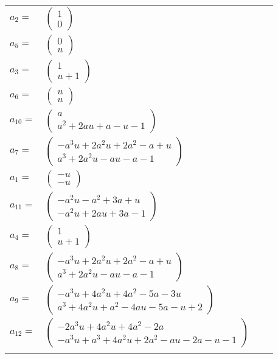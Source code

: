 \documentclass[1p]{elsarticle_modified}
\theoremstyle{definition}
\begin{document}
\begin{tabular}{m{7pt} m{180pt} m{7pt} m{180pt} }
\flushright $a_{2}=$&$\begin{pmatrix}1\\0\end{pmatrix}$ \\
\flushright $a_{5}=$&$\begin{pmatrix}0\\u\end{pmatrix}$ \\
\flushright $a_{3}=$&$\begin{pmatrix}1\\u+1\end{pmatrix}$ \\
\flushright $a_{6}=$&$\begin{pmatrix}u\\u\end{pmatrix}$ \\
\flushright $a_{10}=$&$\begin{pmatrix}a\\a^2+2 a u+a- u-1\end{pmatrix}$ \\
\flushright $a_{7}=$&$\begin{pmatrix}- a^3 u+2 a^2 u+2 a^2- a+u\\a^3+2 a^2 u- a u- a-1\end{pmatrix}$ \\
\flushright $a_{1}=$&$\begin{pmatrix}- u\\- u\end{pmatrix}$ \\
\flushright $a_{11}=$&$\begin{pmatrix}- a^2 u- a^2+3 a+u\\- a^2 u+2 a u+3 a-1\end{pmatrix}$ \\
\flushright $a_{4}=$&$\begin{pmatrix}1\\u+1\end{pmatrix}$ \\
\flushright $a_{8}=$&$\begin{pmatrix}- a^3 u+2 a^2 u+2 a^2- a+u\\a^3+2 a^2 u- a u- a-1\end{pmatrix}$ \\
\flushright $a_{9}=$&$\begin{pmatrix}- a^3 u+4 a^2 u+4 a^2-5 a-3 u\\a^3+4 a^2 u+a^2-4 a u-5 a- u+2\end{pmatrix}$ \\
\flushright $a_{12}=$&$\begin{pmatrix}-2 a^3 u+4 a^2 u+4 a^2-2 a\\- a^3 u+a^3+4 a^2 u+2 a^2- a u-2 a- u-1\end{pmatrix}$\\&\end{tabular}
\end{document}
